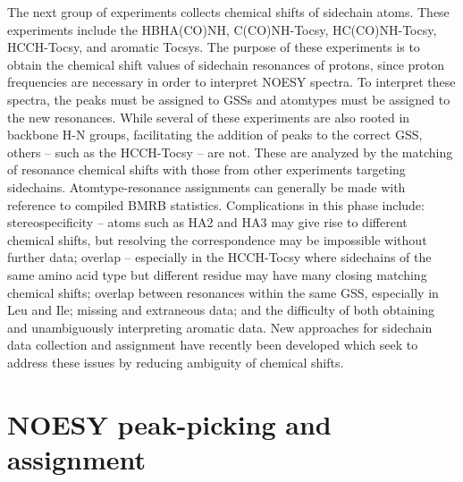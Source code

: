 The next group of experiments collects chemical shifts of sidechain atoms.  
These experiments include the HBHA(CO)NH, C(CO)NH-Tocsy, HC(CO)NH-Tocsy, 
HCCH-Tocsy, and aromatic Tocsys.  The purpose of these experiments is to 
obtain the chemical shift values of sidechain resonances of protons, since 
proton frequencies are necessary in order to interpret NOESY spectra.  To 
interpret these spectra, the peaks must be assigned to GSSs and atomtypes 
must be assigned to the new resonances. While several of these experiments 
are also rooted in backbone H-N groups, facilitating the addition of peaks 
to the correct GSS, others -- such as the HCCH-Tocsy -- are not.  These are 
analyzed by the matching of resonance chemical shifts with those from other 
experiments targeting sidechains.  Atomtype-resonance assignments can generally 
be made with reference to compiled BMRB statistics.  Complications in this 
phase include: stereospecificity -- atoms such as HA2 and HA3 may give rise 
to different chemical shifts, but resolving the correspondence may be 
impossible without further data; overlap -- especially in the HCCH-Tocsy 
where sidechains of the same amino acid type but different residue may have 
many closing matching chemical shifts; overlap between resonances within the 
same GSS, especially in Leu and Ile; missing and extraneous data; and the 
difficulty of both obtaining and unambiguously interpreting aromatic data.  
New approaches for sidechain data collection and assignment have recently 
been developed \cite{mobli2010non, hiller2008apsy} which seek to address 
these issues by reducing ambiguity of chemical shifts.


\section{NOESY peak-picking and assignment}

